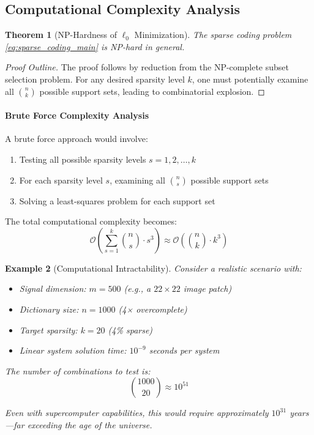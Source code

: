 \documentclass[12pt]{article}
\newtheorem{theorem}{Theorem}[section]
\newtheorem{example}[theorem]{Example}
\begin{document}
\subsection{Computational Complexity Analysis}

\begin{theorem}[NP-Hardness of $\ell_0$ Minimization]\label{thm:np_hardness}
    The sparse coding problem \eqref{eq:sparse_coding_main} is NP-hard in general.
\end{theorem}

\begin{proof}[Proof Outline]
    The proof follows by reduction from the NP-complete subset selection problem. For any desired sparsity level $k$, one must potentially examine all $\binom{n}{k}$ possible support sets, leading to combinatorial explosion.
\end{proof}

\paragraph{Brute Force Complexity Analysis}

A brute force approach would involve:
\begin{enumerate}
    \item Testing all possible sparsity levels $s = 1, 2, \ldots, k$
    \item For each sparsity level $s$, examining all $\binom{n}{s}$ possible support sets
    \item Solving a least-squares problem for each support set
\end{enumerate}

The total computational complexity becomes:
\begin{equation}\label{eq:brute_force_complexity}
    \mathcal{O}\left(\sum_{s=1}^k \binom{n}{s} \cdot s^3\right) \approx \mathcal{O}\left(\binom{n}{k} \cdot k^3\right)
\end{equation}

\begin{example}[Computational Intractability]\label{ex:computational_example}
    Consider a realistic scenario with:
    \begin{itemize}
        \item Signal dimension: $m = 500$ (e.g., a $22 \times 22$ image patch)
        \item Dictionary size: $n = 1000$ (4× overcomplete)
        \item Target sparsity: $k = 20$ (4\% sparse)
        \item Linear system solution time: $10^{-9}$ seconds per system
    \end{itemize}

    The number of combinations to test is:
    \begin{equation}
        \binom{1000}{20} \approx 10^{51}
    \end{equation}

    Even with supercomputer capabilities, this would require approximately $10^{31}$ years—far exceeding the age of the universe.
\end{example}
\end{document}

